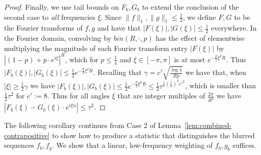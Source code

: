 \documentclass[11pt]{article}
\theoremstyle{plain}
\begin{document}
\begin{proof}
Finally, we use tail bounds on $F_b,G_b$ to extend the conclusion of the second case to \emph{all} frequencies $\xi$. Since $\|f\|_1,\|g\|_1\leq\frac{1}{2}$, we define $F,G$ to be the Fourier transforms of $f,g$ and have that $|F(\xi)|,|G(\xi)|\leq \frac{1}{2}$ everywhere. In the Fourier domain, convolving by $bin(R,\cdot,p)$ has the effect of elementwise multiplying the magnitude of each Fourier transform entry $|F(\xi)|$ by $|(1-p)+p\cdot e^{i\xi}|^R$, which for $p\leq \frac{1}{4}$ and $\xi\in[-\pi,\pi]$ is at most $e^{-\frac{p}{5}\xi^2 R}$. Thus $|F_b(\xi)|,|G_b(\xi)|\leq \frac{1}{2}e^{-\frac{p}{5}\xi^2 R}$. Recalling that $\gamma=c'\sqrt{\frac{\log\frac{1}{\tau}}{Rp}}$ we have that, when $|\xi|\geq \frac{1}{2}\gamma$ we have $|F_b(\xi)|,|G_b(\xi)|\leq \frac{1}{2}e^{-\frac{p}{5}\xi^2 R}\leq \frac{1}{2}\tau^{\frac{1}{5}(\frac{1}{2})^2{c'}^2}$, which is smaller than $\frac{1}{2}\tau^2$ for $c':=8$. Thus for all angles $\xi$ that are integer multiples of $\frac{2\pi}{R^2}$ we have $|F_b(\xi)-G_b(\xi)\cdot e^{i\xi \alpha}|\leq \tau^2$.
\end{proof}

The following corollary continues from Case 2 of Lemma~\ref{lem:combined-contrapositive} to show how to produce a statistic that distinguishes the blurred sequences $f_b,f_g$. We show that a linear, low-frequency weighting of $f_b,g_b$ suffices.
\end{document}
